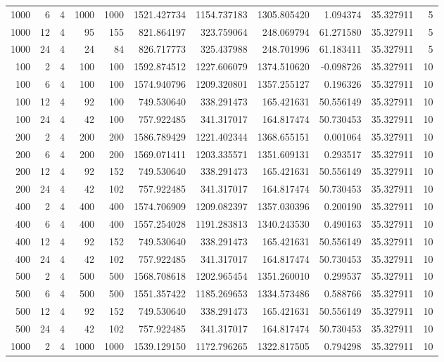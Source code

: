 \begin{table}
\begin{tabular}{rrrrrrrrrrr}
1000 & 6 & 4 & 1000 & 1000 & 1521.427734 & 1154.737183 & 1305.805420 & 1.094374 & 35.327911 & 5 \\
1000 & 12 & 4 & 95 & 155 & 821.864197 & 323.759064 & 248.069794 & 61.271580 & 35.327911 & 5 \\
1000 & 24 & 4 & 24 & 84 & 826.717773 & 325.437988 & 248.701996 & 61.183411 & 35.327911 & 5 \\
100 & 2 & 4 & 100 & 100 & 1592.874512 & 1227.606079 & 1374.510620 & -0.098726 & 35.327911 & 10 \\
100 & 6 & 4 & 100 & 100 & 1574.940796 & 1209.320801 & 1357.255127 & 0.196326 & 35.327911 & 10 \\
100 & 12 & 4 & 92 & 100 & 749.530640 & 338.291473 & 165.421631 & 50.556149 & 35.327911 & 10 \\
100 & 24 & 4 & 42 & 100 & 757.922485 & 341.317017 & 164.817474 & 50.730453 & 35.327911 & 10 \\
200 & 2 & 4 & 200 & 200 & 1586.789429 & 1221.402344 & 1368.655151 & 0.001064 & 35.327911 & 10 \\
200 & 6 & 4 & 200 & 200 & 1569.071411 & 1203.335571 & 1351.609131 & 0.293517 & 35.327911 & 10 \\
200 & 12 & 4 & 92 & 152 & 749.530640 & 338.291473 & 165.421631 & 50.556149 & 35.327911 & 10 \\
200 & 24 & 4 & 42 & 102 & 757.922485 & 341.317017 & 164.817474 & 50.730453 & 35.327911 & 10 \\
400 & 2 & 4 & 400 & 400 & 1574.706909 & 1209.082397 & 1357.030396 & 0.200190 & 35.327911 & 10 \\
400 & 6 & 4 & 400 & 400 & 1557.254028 & 1191.283813 & 1340.243530 & 0.490163 & 35.327911 & 10 \\
400 & 12 & 4 & 92 & 152 & 749.530640 & 338.291473 & 165.421631 & 50.556149 & 35.327911 & 10 \\
400 & 24 & 4 & 42 & 102 & 757.922485 & 341.317017 & 164.817474 & 50.730453 & 35.327911 & 10 \\
500 & 2 & 4 & 500 & 500 & 1568.708618 & 1202.965454 & 1351.260010 & 0.299537 & 35.327911 & 10 \\
500 & 6 & 4 & 500 & 500 & 1551.357422 & 1185.269653 & 1334.573486 & 0.588766 & 35.327911 & 10 \\
500 & 12 & 4 & 92 & 152 & 749.530640 & 338.291473 & 165.421631 & 50.556149 & 35.327911 & 10 \\
500 & 24 & 4 & 42 & 102 & 757.922485 & 341.317017 & 164.817474 & 50.730453 & 35.327911 & 10 \\
1000 & 2 & 4 & 1000 & 1000 & 1539.129150 & 1172.796265 & 1322.817505 & 0.794298 & 35.327911 & 10 \\

\end{tabular}
\end{table}

